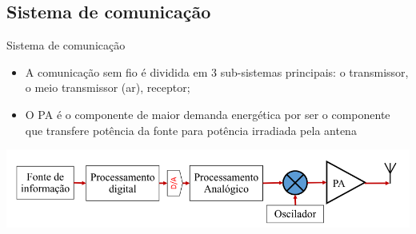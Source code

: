 \documentclass{if-beamer}
\begin{document}
\subsection{Sistema de comunicação}
\begin{frame}{Sistema de comunicação}
	\begin{itemize}
		\item A comunicação sem fio é dividida em 3 sub-sistemas principais:	o transmissor, o meio transmissor (ar), receptor;
		\item O PA é o componente de maior demanda energética por ser o componente que transfere potência da fonte para potência irradiada pela antena
	\end{itemize}
	\includegraphics[scale=0.5]{sistematrasmissorpng.png}
\end{frame}

\end{document}
